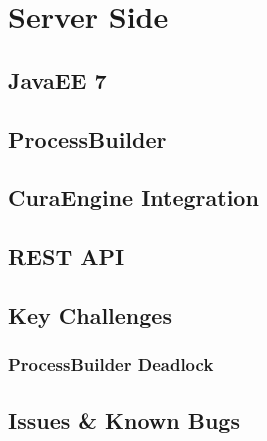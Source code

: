 \chapter{Server Side}

\section{JavaEE 7}
\section{ProcessBuilder}
\section{CuraEngine Integration}
\section{REST API}

\section{Key Challenges}
\subsection{ProcessBuilder Deadlock}
\paragraph{}

\section{Issues \& Known Bugs}


